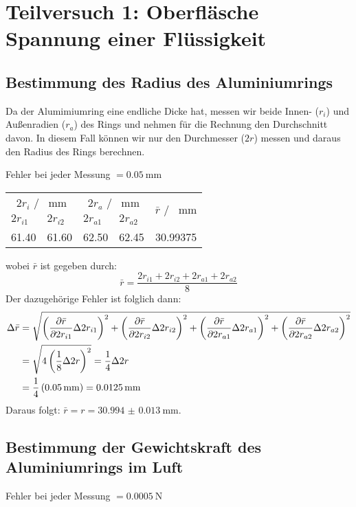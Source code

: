 \section{Teilversuch 1: Oberfläsche Spannung einer Flüssigkeit}
	\subsection{Bestimmung des Radius des Aluminiumrings}
		Da der Alumimiumring eine endliche Dicke hat, messen wir beide Innen- ($r_i$) und Außenradien ($r_a$) des Rings und nehmen für die Rechnung den Durchschnitt davon. In diesem Fall können wir nur den Durchmesser ($2r$) messen und daraus den Radius des Rings berechnen. 

		Fehler bei jeder Messung $= \SI{0.05}{\milli\meter}$

		\begin{center}
			\begin{tabular}{ll ll r}
				\toprule
				\multicolumn{2}{c}{$2r_i$ / \SI{}{\milli\meter}} & \multicolumn{2}{c}{$2r_a$ / \SI{}{\milli\meter}} & \multirow{2}{*}{$\bar{r}$ / \SI{}{\milli\meter}} \\
				$2r_{i1}$ & $2r_{i2}$ & $2r_{a1}$ & $2r_{a2}$ \\
				\midrule
				\num{61.40} & \num{61.60} & \num{62.50} & \num{62.45} & \num{30,99375} \\
				\bottomrule
			\end{tabular}
		\end{center}
		wobei $\bar{r}$ ist gegeben durch:
		\begin{equation}
			\bar{r} = \frac{2r_{i1} + 2r_{i2} + 2r_{a1} + 2r_{a2}}{8}
		\end{equation}
		Der dazugehörige Fehler ist folglich dann:
		\begin{align}
			\Delta \bar{r} &= \gausserror{\bar{r}}{2r_{i1}, 2r_{i2}, 2r_{a1}, 2r_{a2}} \notag \\
			&= \sqrt{4\left(\frac{1}{8}\Delta 2r\right)^2} = \frac{1}{4}\Delta 2r \notag \\
			&= \frac{1}{4}\left(\SI{0.05}{\milli\meter}\right) = \SI{0.0125}{\milli\meter}
		\end{align}
		Daraus folgt: $\bar{r} = r = \SI{30.994(13)}{\milli\meter}$.

	\pagebreak
	\subsection{Bestimmung der Gewichtskraft des Aluminiumrings im Luft}
		Fehler bei jeder Messung $= \SI{0.0005}{\newton}$ 

